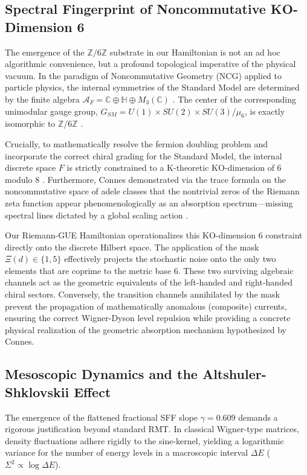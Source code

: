 \documentclass[aps,prl,preprint,superscriptaddress,floatfix]{revtex4-2}
\begin{document}
\subsection{Spectral Fingerprint of Noncommutative KO-Dimension 6}

The emergence of the $\mathbb{Z}/6\mathbb{Z}$ substrate in our Hamiltonian is not an ad hoc algorithmic convenience, but a profound topological imperative of the physical vacuum. In the paradigm of Noncommutative Geometry (NCG) applied to particle physics, the internal symmetries of the Standard Model are determined by the finite algebra $\mathcal{A}_F = \mathbb{C} \oplus \mathbb{H} \oplus M_3(\mathbb{C})$ \cite{Chamseddine2007, Connes2008}. The center of the corresponding unimodular gauge group, $G_{SM} = U(1) \times SU(2) \times SU(3) / \mu_6$, is exactly isomorphic to $\mathbb{Z}/6\mathbb{Z}$ \cite{Connes2008}.

Crucially, to mathematically resolve the fermion doubling problem and incorporate the correct chiral grading for the Standard Model, the internal discrete space $F$ is strictly constrained to a K-theoretic KO-dimension of 6 modulo 8 \cite{Connes2008}. Furthermore, Connes demonstrated via the trace formula on the noncommutative space of adele classes that the nontrivial zeros of the Riemann zeta function appear phenomenologically as an absorption spectrum---missing spectral lines dictated by a global scaling action \cite{Connes1999}.

Our Riemann-GUE Hamiltonian operationalizes this KO-dimension 6 constraint directly onto the discrete Hilbert space. The application of the mask $\Xi(d) \in \{1,5\}$ effectively projects the stochastic noise onto the only two elements that are coprime to the metric base 6. These two surviving algebraic channels act as the geometric equivalents of the left-handed and right-handed chiral sectors. Conversely, the transition channels annihilated by the mask prevent the propagation of mathematically anomalous (composite) currents, ensuring the correct Wigner-Dyson level repulsion while providing a concrete physical realization of the geometric absorption mechanism hypothesized by Connes.

\subsection{Mesoscopic Dynamics and the Altshuler-Shklovskii Effect}

The emergence of the flattened fractional SFF slope $\gamma = 0.609$ demands a rigorous justification beyond standard RMT. In classical Wigner-type matrices, density fluctuations adhere rigidly to the sine-kernel, yielding a logarithmic variance for the number of energy levels in a macroscopic interval $\Delta E$ ($\Sigma^2 \propto \log \Delta E$).
\end{document}
